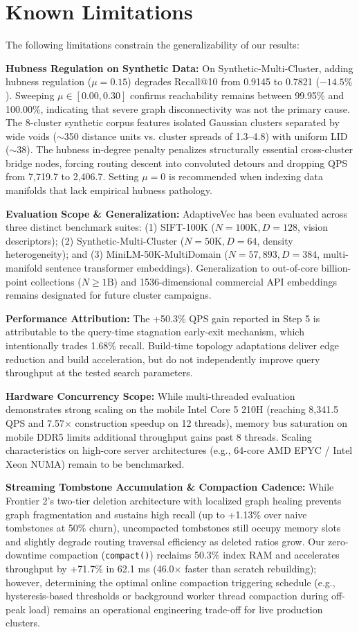 \documentclass[conference,10pt]{IEEEtran}
\begin{document}
\section{Known Limitations}
The following limitations constrain the generalizability of our results:

\textbf{Hubness Regulation on Synthetic Data:} On Synthetic-Multi-Cluster, adding hubness regulation ($\mu=0.15$) degrades Recall@10 from 0.9145 to 0.7821 ($-14.5\%$). Sweeping $\mu \in [0.00, 0.30]$ confirms reachability remains between 99.95\% and 100.00\%, indicating that severe graph disconnectivity was not the primary cause. The 8-cluster synthetic corpus features isolated Gaussian clusters separated by wide voids ($\sim$350 distance units vs. cluster spreads of 1.3--4.8) with uniform LID ($\sim$38). The hubness in-degree penalty penalizes structurally essential cross-cluster bridge nodes, forcing routing descent into convoluted detours and dropping QPS from 7,719.7 to 2,406.7. Setting $\mu = 0$ is recommended when indexing data manifolds that lack empirical hubness pathology.

\textbf{Evaluation Scope \& Generalization:} AdaptiveVec has been evaluated across three distinct benchmark suites: (1) SIFT-100K ($N=100\text{K}, D=128$, vision descriptors); (2) Synthetic-Multi-Cluster ($N=50\text{K}, D=64$, density heterogeneity); and (3) MiniLM-50K-MultiDomain ($N=57,893, D=384$, multi-manifold sentence transformer embeddings). Generalization to out-of-core billion-point collections ($N \ge 1\text{B}$) and 1536-dimensional commercial API embeddings remains designated for future cluster campaigns.

\textbf{Performance Attribution:} The +50.3\% QPS gain reported in Step 5 is attributable to the query-time stagnation early-exit mechanism, which intentionally trades 1.68\% recall. Build-time topology adaptations deliver edge reduction and build acceleration, but do not independently improve query throughput at the tested search parameters.

\textbf{Hardware Concurrency Scope:} While multi-threaded evaluation demonstrates strong scaling on the mobile Intel Core 5 210H (reaching 8,341.5 QPS and 7.57$\times$ construction speedup on 12 threads), memory bus saturation on mobile DDR5 limits additional throughput gains past 8 threads. Scaling characteristics on high-core server architectures (e.g., 64-core AMD EPYC / Intel Xeon NUMA) remain to be benchmarked.

\textbf{Streaming Tombstone Accumulation \& Compaction Cadence:} While Frontier 2's two-tier deletion architecture with localized graph healing prevents graph fragmentation and sustains high recall (up to +1.13\% over naive tombstones at 50\% churn), uncompacted tombstones still occupy memory slots and slightly degrade routing traversal efficiency as deleted ratios grow. Our zero-downtime compaction (\texttt{compact()}) reclaims 50.3\% index RAM and accelerates throughput by +71.7\% in 62.1 ms (46.0$\times$ faster than scratch rebuilding); however, determining the optimal online compaction triggering schedule (e.g., hysteresis-based thresholds or background worker thread compaction during off-peak load) remains an operational engineering trade-off for live production clusters.
\end{document}
